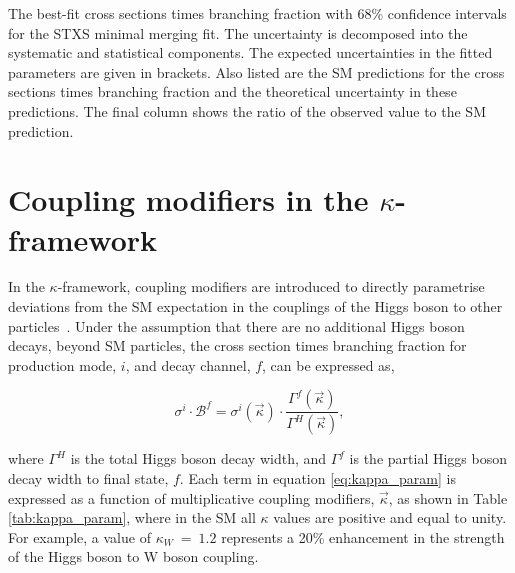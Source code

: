 \begin{table}[htb!]
  \centering
  \scriptsize
  \renewcommand{\arraystretch}{1.8}
  \setlength{\tabcolsep}{2.2pt}
  \caption[Results of the minimal merging fit]
  {
    The best-fit cross sections times branching fraction with 68\% confidence intervals for the STXS minimal merging fit. The uncertainty is decomposed into the systematic and statistical components. The expected uncertainties in the fitted parameters are given in brackets. Also listed are the SM predictions for the cross sections times branching fraction and the theoretical uncertainty in these predictions. The final column shows the ratio of the observed value to the SM prediction.
  }
  \label{tab:stage1p2_minimal_results}
  \hspace*{-.5cm}
  
  \hspace*{-.5cm}
\end{table}

\FloatBarrier
\newpage
\section{Coupling modifiers in the $\kappa$-framework}\label{sec:results_kappa}
In the $\kappa$-framework, coupling modifiers are introduced to directly parametrise deviations from the SM expectation in the couplings of the Higgs boson to other particles~\cite{Heinemeyer:2013tqa}. Under the assumption that there are no additional Higgs boson decays, beyond SM particles, the cross section times branching fraction for production mode, $i$, and decay channel, $f$, can be expressed as,

\begin{equation}\label{eq:kappa_param}
    \sigma^i \cdot \mathcal{B}^f = \sigma^i(\vec{\kappa}) \cdot \frac{\Gamma^f(\vec{\kappa})}{\Gamma^H(\vec{\kappa})},
\end{equation}

\noindent
where $\Gamma^H$ is the total Higgs boson decay width, and $\Gamma^f$ is the partial Higgs boson decay width to final state, $f$. Each term in equation \ref{eq:kappa_param} is expressed as a function of multiplicative coupling modifiers, $\vec{\kappa}$, as shown in Table \ref{tab:kappa_param}, where in the SM all $\kappa$ values are positive and equal to unity. For example, a value of $\kappa_W~=~1.2$ represents a 20\% enhancement in the strength of the Higgs boson to W boson coupling.

